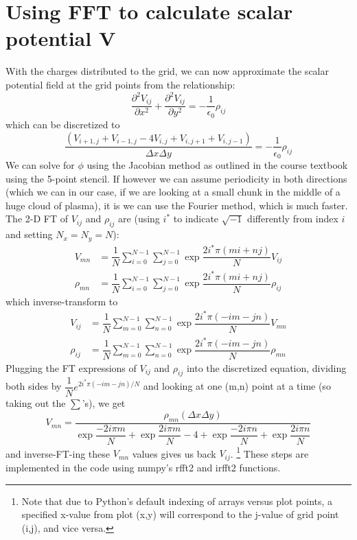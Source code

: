 \documentclass{article}
\begin{document}
\section{Using FFT to calculate scalar potential V}
With the charges distributed to the grid, we can now approximate the scalar potential field at the grid points from the relationship:
\begin{equation}
\dfrac{\partial^2V_{ij}}{\partial x^2} + \dfrac{\partial^2V_{ij}}{\partial y^2} = -\dfrac{1}{\epsilon_0}\rho_{ij}
\end{equation}
which can be discretized to 
\begin{equation}
\dfrac{(V_{i+1, j} + V_{i-1,j} - 4V_{i,j} + V_{i,j+1} + V_{i,j-1})}{\Delta x\Delta y} = -\dfrac{1}{\epsilon_0}\rho_{ij}
\end{equation}
We can solve for $\phi$ using the Jacobian method as outlined in the course textbook using the 5-point stencil. If however we can assume periodicity in both directions (which we can in our case, if we are looking at a small chunk in the middle of a huge cloud of plasma), it is we can use the Fourier method, which is much faster. The 2-D FT of $V_{ij}$ and $\rho_{ij}$ are (using $i^*$ to indicate $\sqrt{-1}$ differently from index $i$ and setting $N_x=N_y=N$):
\begin{equation}
\begin{split}
V_{mn} &= \dfrac{1}{N}\sum_{i=0}^{N-1}\sum_{j=0}^{N -1}\exp{\dfrac{2i^*\pi(mi + nj)}{N}}V_{ij} \\
\rho_{mn} &= \dfrac{1}{N}\sum_{i=0}^{N-1}\sum_{j=0}^{N-1}\exp{\dfrac{2i^*\pi(mi +nj)}{N}}\rho_{ij}
\end{split}
\end{equation}
which inverse-transform to
\begin{equation}
\begin{split}
V_{ij} &= \dfrac{1}{N}\sum_{m=0}^{N-1}\sum_{n=0}^{N-1}\exp{\dfrac{2i^*\pi(-im-jn)}{N}}V_{mn}\\
\rho_{ij} &= \dfrac{1}{N}\sum_{m=0}^{N-1}\sum_{n=0}^{N-1}\exp{\dfrac{2i^*\pi(-im-jn)}{N}}\rho_{mn}
\end{split}
\end{equation}
Plugging the FT expressions of $V_{ij}$ and $\rho_{ij}$ into the discretized equation, dividing both sides by $\dfrac{1}{N}e^{2i^*\pi(-im-jn)/N}$ and looking at one (m,n) point at a time (so taking out the $\sum$'s), we get 
\begin{equation}
V_{mn} = \dfrac{\rho_{mn}(\Delta x\Delta y)}{\exp{\dfrac{-2i\pi m}{N}}+\exp{\dfrac{2i\pi m}{N}}-4+\exp{\dfrac{-2i\pi n}{N}}+\exp{\dfrac{2i\pi n}{N}}}
\end{equation}
and inverse-FT-ing these $V_{mn}$ values gives us back $V_{ij}$. \footnote{Note that due to Python's default indexing of arrays versus plot points, a specified x-value from plot (x,y) will correspond to the j-value of grid point (i,j), and vice versa.} These steps are implemented in the code using numpy's rfft2 and irfft2 functions. 
\end{document}
